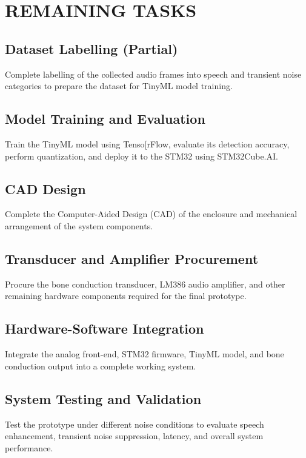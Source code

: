 \chapter{REMAINING TASKS}

\section{Dataset Labelling (Partial)}
Complete labelling of the collected audio frames into speech and transient noise categories to prepare the dataset for TinyML model training.


\section{Model Training and Evaluation}
Train the TinyML model using Tenso[rFlow, evaluate its detection accuracy, perform quantization, and deploy it to the STM32 using STM32Cube.AI.

\section{CAD Design}
Complete the Computer-Aided Design (CAD) of the enclosure and mechanical arrangement of the system components.

\section{Transducer and Amplifier Procurement}
Procure the bone conduction transducer, LM386 audio amplifier, and other remaining hardware components required for the final prototype.

\section{Hardware-Software Integration}
Integrate the analog front-end, STM32 firmware, TinyML model, and bone conduction output into a complete working system.

\section{System Testing and Validation}
Test the prototype under different noise conditions to evaluate speech enhancement, transient noise suppression, latency, and overall system performance.

